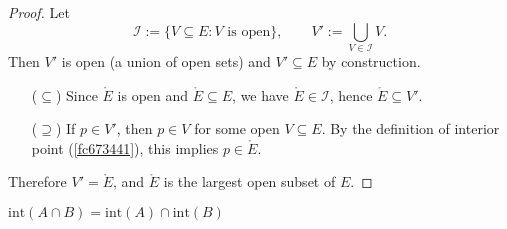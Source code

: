 \begin{proof}
    Let
    \[
        \mathcal{I} := \{V \subseteq E : V \text{ is open} \}, \qquad
        V' := \bigcup_{V \in \mathcal{I}} V .
    \]
    Then $V'$ is open (a union of open sets) and $V'\subseteq E$ by construction.

    \begin{enumerate}
        \item[($\subseteq$)] Since $\mathring{E}$ is open and $\mathring{E}\subseteq E$, 
        we have $\mathring{E}\in\mathcal{I}$, hence $\mathring{E}\subseteq V'$.

        \item[($\supseteq$)] If $p\in V'$, then $p\in V$ for some open $V\subseteq E$. 
        By the definition of interior point (\cref{fc673441}), this implies $p\in\mathring{E}$.
    \end{enumerate}

    Therefore $V'=\mathring{E}$, and $\mathring{E}$ is the largest open subset of $E$.
\end{proof}

\begin{thm}
    $\mathrm{int}(A \cap B) = \mathrm{int}(A) \cap \mathrm{int}(B)$
\end{thm}

